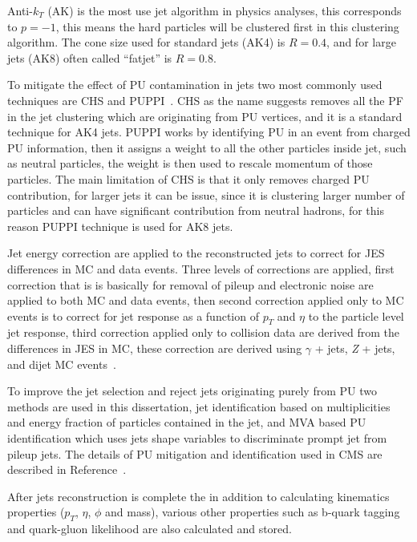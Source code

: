 Anti-\( k_T \) (AK) is the most use jet algorithm in physics analyses, this corresponds to
\( p = -1\), this means the hard particles will be clustered first in this clustering
algorithm.
The cone size used for standard jets (AK4) is \( R = 0.4 \), and for large jets (AK8) often called
``fatjet'' is \( R = 0.8 \).

To mitigate the effect of \gls{PU} contamination in jets two most commonly used
techniques are \gls{CHS} and \gls{PUPPI}~\cite{puppi2014}.
\gls{CHS} as the name suggests removes all the \gls{PF} in the jet clustering which are
originating from \gls{PU} vertices, and it is a standard technique for AK4 jets.
\gls{PUPPI} works by identifying \gls{PU} in an event from charged \gls{PU} information,
then it assigns a weight to all the other particles inside jet, such as neutral particles,
the weight is then used to rescale momentum of those particles.
The main limitation of \gls{CHS} is that it only removes charged \gls{PU} contribution,
for larger jets it can be issue, since it is clustering larger number of particles
and can have significant contribution from neutral hadrons, for this reason \gls{PUPPI}
technique is used for AK8 jets.

Jet energy correction are applied to the reconstructed
jets to correct for \gls{JES} differences in \gls{MC} and data events.
Three levels of corrections are applied,
first correction that is is basically for removal of pileup and electronic noise
are applied to both \gls{MC} and data events, then
second correction applied only to \gls{MC} events
is to correct for jet response as a function of \( p_T \) and
\( \eta \) to the particle level jet response, third
correction applied only to collision data
are derived from the differences in \gls{JES} in \gls{MC}, these
correction are derived using \( \gamma \) + jets, \textit{Z} + jets, and dijet
\gls{MC} events~\cite{CMS-DP-2020-019}.

To improve the jet selection and reject jets originating purely from \gls{PU}
two methods are used in this dissertation, jet identification based on
multiplicities and energy fraction of particles contained in the jet,
and \gls{MVA} based \gls{PU} identification which uses jets shape
variables to discriminate prompt jet from pileup jets.
The details of \gls{PU} mitigation and identification used in
\gls{CMS} are described in Reference~\cite{cms-jme-pu-run2}.

After jets reconstruction is complete the in addition to calculating kinematics
properties (\( p_T \), \( \eta \), \( \phi \) and mass), various other
properties such as b-quark tagging and quark-gluon likelihood are also
calculated and stored.


